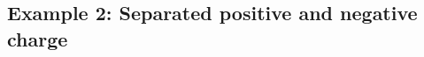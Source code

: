 \documentclass[aps,pre,preprint,unsortedaddress]{revtex4}
\renewcommand{\v}[1]{\textbf{\textit{#1}}}
\begin{document}




\subsection{Example 2: Separated positive and negative charge}
\label{sec:example2}

\end{document}
